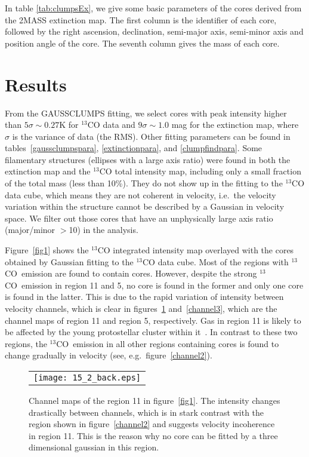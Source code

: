 \documentclass[12pt,preprint]{aastex}
\def\13co{$^{13}$CO}
\begin{document}
In table \ref{tab:clumpsEx}, we give some basic parameters of the cores derived from the 2MASS extinction map. The first column is the identifier of each core, followed by the right ascension, declination, semi-major axis,
semi-minor axis and position angle of the core. The seventh column gives the mass of each core.






\section{Results}
\label{sec:results}

From the GAUSSCLUMPS fitting, we select cores with peak intensity
higher than $5\sigma\sim 0.27$K for $^{13}$CO data and $9\sigma\sim
1.0$ mag for the extinction map, where $\sigma$ is the variance of
data (the RMS). Other fitting parameters can be found in
tables~\ref{gaussclumpspara}, \ref{extinctionpara}, and
\ref{clumpfindpara}. Some filamentary structures (ellipses with a
large axis ratio) were found in both the extinction map and the
$^{13}$CO total intensity map, including only a small fraction of
the total mass (less than 10\%). They do not show up in the fitting
to the $^{13}$CO data cube, which means they are not coherent in
velocity, i.e.\, the velocity variation within the structure cannot be described by
a Gaussian in velocity space. We filter out those cores that have an unphysically large
axis ratio (major/minor $>$10) in the analysis.

Figure~\ref{fig1} shows the $^{13}$CO integrated intensity map overlayed with the cores obtained by Gaussian fitting to the $^{13}$CO data cube.
Most of the regions with \13co\ emission are found to contain cores. However, despite the strong \13co\ emission  in region 11 and 5, no core is found in the former and only one core is found in the latter. This is due to
the rapid variation of intensity between velocity channels, which is clear in figures~\ref{channel} and~\ref{channel3},
which are the channel maps of region 11 and region 5, respectively.
Gas in region 11 is likely to be affected by the young protostellar cluster  within it~\citep{L1495_B10}.
In contrast to these two regions, the \13co\ emission in all other regions containing cores is found to change gradually in velocity (see, e.g.\ figure~\ref{channel2}).

\begin{figure}[htb]
\begin{tabular}{c}
\texttt{[image: 15\_2\_back.eps]}\\
\end{tabular}
\caption{Channel maps of the region 11 in figure~\ref{fig1}. The intensity changes drastically between channels, which is
in stark  contrast with the region shown in  figure~\ref{channel2} and suggests velocity incoherence in region 11. This is the reason why no core can
be fitted by a three dimensional gaussian in this region. \label{channel}}
\end{figure}
\end{document}
